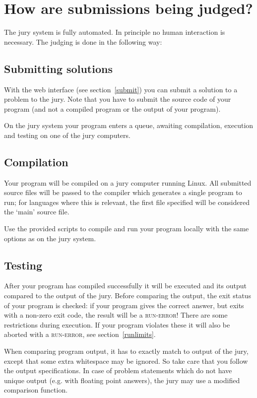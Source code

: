 \section{How are submissions being judged?}\label{howjudged}

The \DOMjudge jury system is fully automated. In principle no human
interaction is necessary. The judging is done in the following way:

\subsection{Submitting solutions}

With%
the web interface (see section~\ref{submit}) you can submit a solution
to a problem to the jury. Note that you have to submit the source code
of your program (and not a compiled program or the output of your
program).

On the jury system your program enters a queue, awaiting compilation,
execution and testing on one of the jury computers.

\subsection{Compilation}

Your program will be compiled on a jury computer running Linux.
All submitted source files will be passed to the compiler which
generates a single program to run; for languages where
this is relevant, the first file specified will be considered the
`main' source file.

Use the provided scripts to compile and run your program locally with
the same options as on the jury system.

\subsection{Testing}

After your program has compiled successfully it will be executed and
its output compared to the output of the jury. Before comparing the
output, the exit status of your program is checked: if your program
gives the correct answer, but exits with a non-zero exit code, the
result will be a \textsc{run-error}! There are some restrictions during
execution. If your program violates these it will also be aborted
with a \textsc{run-error}, see section~\ref{runlimits}.

When comparing program output, it has to exactly match to output of
the jury, except that some extra whitespace may be ignored. So take
care that you follow the output specifications. In case of problem
statements which do not have unique output (e.g. with floating point
answers), the jury may use a modified comparison function.

